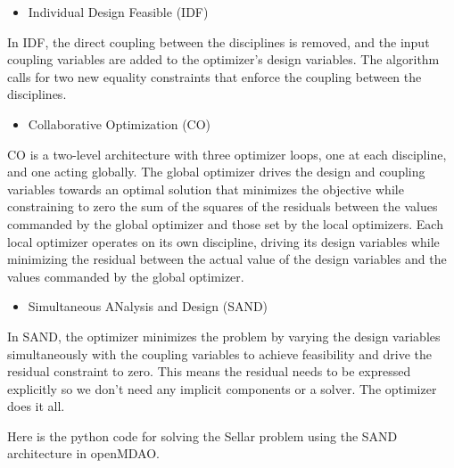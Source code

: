 \documentclass[11pt]{article}
\providecommand{\tightlist}{%
      \setlength{\itemsep}{0pt}\setlength{\parskip}{0pt}}
\begin{document}
    \begin{itemize}
\tightlist
\item
  Individual Design Feasible (IDF)
\end{itemize}

In IDF, the direct coupling between the disciplines is removed, and the
input coupling variables are added to the optimizer's design variables.
The algorithm calls for two new equality constraints that enforce the
coupling between the disciplines.

\begin{itemize}
\tightlist
\item
  Collaborative Optimization (CO)
\end{itemize}

CO is a two-level architecture with three optimizer loops, one at each
discipline, and one acting globally. The global optimizer drives the
design and coupling variables towards an optimal solution that minimizes
the objective while constraining to zero the sum of the squares of the
residuals between the values commanded by the global optimizer and those
set by the local optimizers. Each local optimizer operates on its own
discipline, driving its design variables while minimizing the residual
between the actual value of the design variables and the values
commanded by the global optimizer.

    \begin{itemize}
\tightlist
\item
  Simultaneous ANalysis and Design (SAND)
\end{itemize}

In SAND, the optimizer minimizes the problem by varying the design
variables simultaneously with the coupling variables to achieve
feasibility and drive the residual constraint to zero. This means the
residual needs to be expressed explicitly so we don't need any implicit
components or a solver. The optimizer does it all.

Here is the python code for solving the Sellar problem using the SAND
architecture in openMDAO.
\end{document}
